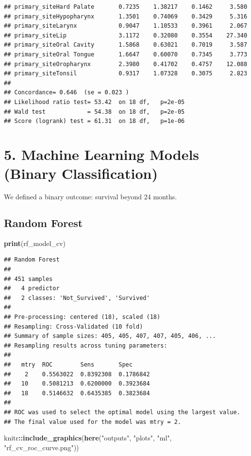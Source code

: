 \documentclass[
  11pt,
]{article}
\newenvironment{Shaded}{\begin{snugshade}}{\end{snugshade}}
\newcommand{\FunctionTok}[1]{\textcolor[rgb]{0.13,0.29,0.53}{\textbf{#1}}}
\newcommand{\NormalTok}[1]{#1}
\newcommand{\SpecialCharTok}[1]{\textcolor[rgb]{0.81,0.36,0.00}{\textbf{#1}}}
\newcommand{\StringTok}[1]{\textcolor[rgb]{0.31,0.60,0.02}{#1}}
\begin{document}
\begin{verbatim}
## primary_siteHard Palate       0.7235    1.38217    0.1462     3.580
## primary_siteHypopharynx       1.3501    0.74069    0.3429     5.316
## primary_siteLarynx            0.9047    1.10533    0.3961     2.067
## primary_siteLip               3.1172    0.32080    0.3554    27.340
## primary_siteOral Cavity       1.5868    0.63021    0.7019     3.587
## primary_siteOral Tongue       1.6647    0.60070    0.7345     3.773
## primary_siteOropharynx        2.3980    0.41702    0.4757    12.088
## primary_siteTonsil            0.9317    1.07328    0.3075     2.823
## 
## Concordance= 0.646  (se = 0.023 )
## Likelihood ratio test= 53.42  on 18 df,   p=2e-05
## Wald test            = 54.38  on 18 df,   p=2e-05
## Score (logrank) test = 61.31  on 18 df,   p=1e-06
\end{verbatim}

\section{5. Machine Learning Models (Binary
Classification)}\label{machine-learning-models-binary-classification}

We defined a binary outcome: survival beyond 24 months.

\subsection{Random Forest}\label{random-forest}

\begin{Shaded}
\begin{Highlighting}[]
\FunctionTok{print}\NormalTok{(rf\_model\_cv)}
\end{Highlighting}
\end{Shaded}

\begin{verbatim}
## Random Forest 
## 
## 451 samples
##   4 predictor
##   2 classes: 'Not_Survived', 'Survived' 
## 
## Pre-processing: centered (18), scaled (18) 
## Resampling: Cross-Validated (10 fold) 
## Summary of sample sizes: 405, 405, 407, 407, 405, 406, ... 
## Resampling results across tuning parameters:
## 
##   mtry  ROC        Sens       Spec     
##    2    0.5563022  0.8392308  0.1786842
##   10    0.5081213  0.6200000  0.3923684
##   18    0.5146632  0.6435385  0.3823684
## 
## ROC was used to select the optimal model using the largest value.
## The final value used for the model was mtry = 2.
\end{verbatim}

\begin{Shaded}
\begin{Highlighting}[]
\NormalTok{knitr}\SpecialCharTok{::}\FunctionTok{include\_graphics}\NormalTok{(}\FunctionTok{here}\NormalTok{(}\StringTok{"outputs"}\NormalTok{, }\StringTok{"plots"}\NormalTok{, }\StringTok{"ml"}\NormalTok{, }\StringTok{"rf\_cv\_roc\_curve.png"}\NormalTok{))}
\end{Highlighting}
\end{Shaded}
\end{document}
